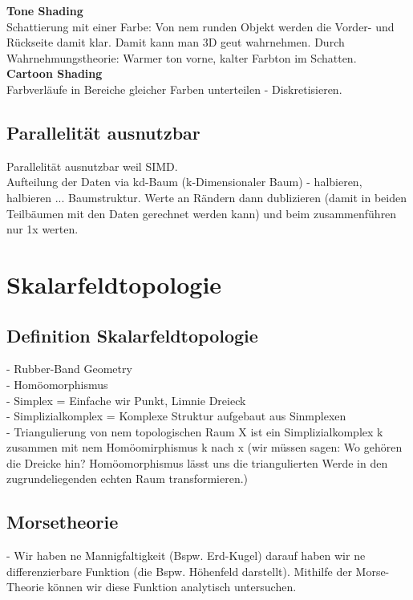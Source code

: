 \documentclass{article}
\begin{document}
\noindent \textbf{Tone Shading}\\
Schattierung mit einer Farbe: Von nem runden Objekt werden die Vorder- und Rückseite damit klar. Damit kann man 3D geut wahrnehmen. Durch Wahrnehmungstheorie: Warmer ton vorne, kalter Farbton im Schatten.\\

\noindent \textbf{Cartoon Shading}\\
Farbverläufe in Bereiche gleicher Farben unterteilen - Diskretisieren.\\


\subsection{Parallelität ausnutzbar}
Parallelität ausnutzbar weil SIMD.\\
Aufteilung der Daten via kd-Baum (k-Dimensionaler Baum) - halbieren, halbieren ... Baumstruktur. Werte an Rändern dann dublizieren (damit in beiden Teilbäumen mit den Daten gerechnet werden kann) und beim zusammenführen nur 1x werten.


\pagebreak
\section{Skalarfeldtopologie}

\subsection{Definition Skalarfeldtopologie}
- Rubber-Band Geometry\\
- Homöomorphismus \\


- Simplex = Einfache wir Punkt, Limnie Dreieck\\
- Simplizialkomplex = Komplexe Struktur aufgebaut aus Sinmplexen\\
- Triangulierung von nem topologischen Raum X ist ein Simplizialkomplex k zusammen mit nem Homöomirphismus k nach x (wir müssen sagen: Wo gehören die Dreicke hin? Homöomorphismus lässt uns die triangulierten Werde in den zugrundeliegenden echten Raum transformieren.)

\subsection{Morsetheorie}
- Wir haben ne Mannigfaltigkeit (Bspw. Erd-Kugel) darauf haben wir ne differenzierbare Funktion (die Bspw. Höhenfeld darstellt). Mithilfe der Morse-Theorie können wir diese Funktion analytisch untersuchen.
\end{document}
